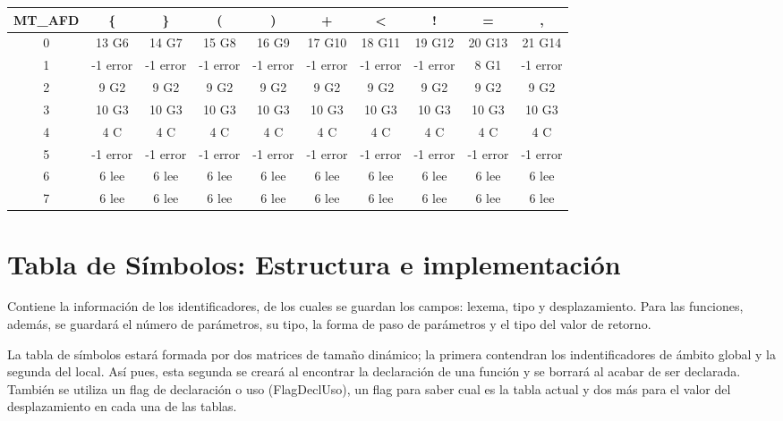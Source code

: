\documentclass[a4paper, 12pt]{article}
\begin{document}
\hspace*{-80pt} \begin{tabular}{|c|c|c|c|c|c|c|c|c|c|}
\hline
    \textbf{MT\_AFD}     & \textbf{\{}     & \textbf{\}}     & \textbf{(}     & \textbf{)}     & \textbf{+}     & \textbf{\textless}     & \textbf{!}     & \textbf{=}     & \textbf{,} \\
\hline
    0 & 13 G6 & 14 G7 & 15 G8 & 16 G9 & 17 G10 & 18 G11 & 19 G12 & 20 G13 & 21 G14 \\
\hline
    1 & -1 error & -1 error & -1 error & -1 error & -1 error & -1 error & -1 error & 8 G1  & -1 error \\
\hline
    2 & 9 G2  & 9 G2  & 9 G2  & 9 G2  & 9 G2  & 9 G2  & 9 G2  & 9 G2  & 9 G2 \\
\hline
    3 & 10 G3 & 10 G3 & 10 G3 & 10 G3 & 10 G3 & 10 G3 & 10 G3 & 10 G3 & 10 G3 \\
\hline
    4 & 4 C   & 4 C   & 4 C   & 4 C   & 4 C   & 4 C   & 4 C   & 4 C   & 4 C \\
\hline
    5 & -1 error & -1 error & -1 error & -1 error & -1 error & -1 error & -1 error & -1 error & -1 error \\
\hline
    6 & 6 lee & 6 lee & 6 lee & 6 lee & 6 lee & 6 lee & 6 lee & 6 lee & 6 lee \\
\hline
    7 & 6 lee & 6 lee & 6 lee & 6 lee & 6 lee & 6 lee & 6 lee & 6 lee & 6 lee \\
\hline
    \end{tabular}\hspace{-80pt}
    
\section{Tabla de Símbolos: Estructura e implementación}
Contiene la información de los identificadores, de los cuales se guardan los campos: lexema, tipo y desplazamiento.
Para las funciones, además, se guardará el número de parámetros, su tipo, la forma de paso de parámetros y el tipo del valor de retorno.

La tabla de símbolos estará formada por dos matrices de tamaño dinámico; la primera contendran los indentificadores de ámbito global y la segunda del local. Así pues, esta segunda se creará al encontrar la declaración de una función y se borrará al acabar de ser declarada. También se utiliza un flag de declaración o uso (FlagDeclUso), un flag para saber cual es la tabla actual y dos más para el valor del desplazamiento en cada una de las tablas.
\end{document}
